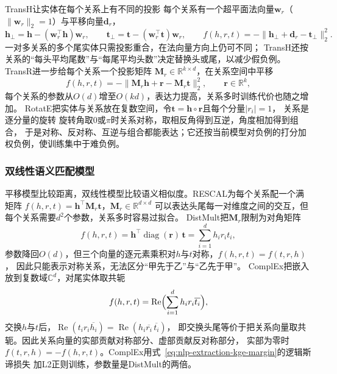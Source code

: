 TransH让实体在每个关系上有不同的投影
每个关系有一个超平面法向量$\bm{w}_r$（$\lVert\bm{w}_r\rVert_2=1$）与平移向量$\bm{d}_r$，
\begin{equation}
  \bm{h}_{\perp}=\bm{h}-(\bm{w}_r^{\top}\bm{h})\bm{w}_r,\qquad
  \bm{t}_{\perp}=\bm{t}-(\bm{w}_r^{\top}\bm{t})\bm{w}_r,\qquad
  f(h,r,t)=-\lVert\bm{h}_{\perp}+\bm{d}_r-\bm{t}_{\perp}\rVert_2^2.
  \label{eq:nlp-extraction-transh}
\end{equation}
一对多关系的多个尾实体只需投影重合，在法向量方向上仍可不同；
TransH还按关系的“每头平均尾数”与“每尾平均头数”决定替换头或尾，以减少假负例。TransR进一步给每个关系一个投影矩阵
$\bm{M}_r\in\mathbb{R}^{k\times d}$，在关系空间中平移
\begin{equation}
  f(h,r,t)=-\lVert\bm{M}_r\bm{h}+\bm{r}-\bm{M}_r\bm{t}\rVert_2^2,\qquad \bm{r}\in\mathbb{R}^{k},
  \label{eq:nlp-extraction-transr}
\end{equation}
每个关系的参数从$O(d)$增至$O(kd)$，表达力提高，关系多时训练代价也随之增加。
RotatE把实体与关系放在复数空间，令$\bm{t}=\bm{h}\circ\bm{r}$且每个分量$|r_i|=1$，
关系是逐分量的旋转
旋转角取0或$\pi$时关系对称，取相反角得到互逆，角度相加得到组合，
于是对称、反对称、互逆与组合都能表达；它还按当前模型对负例的打分加权负例，使训练集中于难负例。

\subsubsection{双线性语义匹配模型}
\label{sec:nlp-extraction-bilinear}

平移模型比较距离，双线性模型比较语义相似度。RESCAL为每个关系配一个满矩阵
$f(h,r,t)=\bm{h}^{\top}\bm{M}_r\bm{t}$，$\bm{M}_r\in\mathbb{R}^{d\times d}$
可以表达头尾每一对维度之间的交互，但每个关系需要$d^2$个参数，关系多时容易过拟合。
DistMult把$\bm{M}_r$限制为对角矩阵
\begin{equation}
  f(h,r,t)=\bm{h}^{\top}\operatorname{diag}(\bm{r})\,\bm{t}=\sum_{i=1}^{d}h_ir_it_i,
  \label{eq:nlp-extraction-distmult}
\end{equation}
参数降回$O(d)$，但三个向量的逐元素乘积对$h$与$t$对称，$f(h,r,t)=f(t,r,h)$，
因此只能表示对称关系，无法区分“甲先于乙”与“乙先于甲”。
ComplEx把嵌入放到复数域$\mathbb{C}^{d}$，对尾实体取共轭
\begin{equation}
  f(h,r,t)=\operatorname{Re}\Bigl(\sum_{i=1}^{d}h_ir_i\overline{t_i}\Bigr),
  \label{eq:nlp-extraction-complex}
\end{equation}
交换$h$与$t$后，$\operatorname{Re}(t_ir_i\overline{h_i})=\operatorname{Re}(h_i\overline{r_i}\,\overline{t_i})$，
即交换头尾等价于把关系向量取共轭。因此关系向量的实部贡献对称部分、虚部贡献反对称部分，
实部为零时$f(t,r,h)=-f(h,r,t)$。ComplEx用式~\eqref{eq:nlp-extraction-kge-margin}的逻辑斯谛损失
加L2正则训练，参数量是DistMult的两倍。

